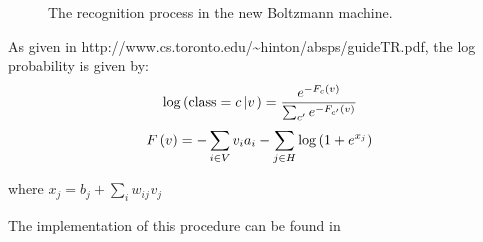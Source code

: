 \begin{figure}[h]
  \caption{The recognition process in the new Boltzmann machine.}
\end{figure}



As given in http://www.cs.toronto.edu/\~{ }hinton/absps/guideTR.pdf, the log
probability is given by:
\[ {\log} \left( \operatorname{class} = c \left| v \right. \right) =
   \frac{e^{- F_c \left( v \right)}}{\sum_{c'} e^{- F_{c'} \left( v
   \right)}} \]
\[ F \left( v \right) = - \sum_{i \in V} v_i a_i - \sum_{j \in H} \log \left(
   1  + e^{x_j} \right) \]


where $x_j = b_j + \sum_i w_{ij_{}} v_j$



The implementation of this procedure can be found in

